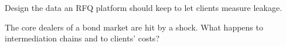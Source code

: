 \begin{interviewq}\label{iq:mx:request-for-quote-and-dealer-markets-in-theory:5}
Design the data an RFQ platform should keep to let clients measure leakage.
\end{interviewq}

\begin{interviewq}\label{iq:mx:request-for-quote-and-dealer-markets-in-theory:6}
The core dealers of a bond market are hit by a shock. What happens to intermediation chains and to clients' costs?
\end{interviewq}

